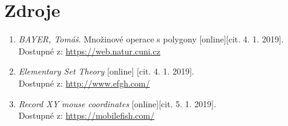\documentclass[a4paper, 12pt]{article}
\begin{document}
\section{Zdroje}
\begin{enumerate}
\item  \textsl{BAYER, Tomáš}. Množinové operace s polygony [online][cit. 4. 1. 2019].\\
Dostupné z: \href{https://web.natur.cuni.cz/~bayertom/images/courses/Adk/adk9.pdf}{https://web.natur.cuni.cz}

\item  \textsl{Elementary Set Theory} [online] [cit. 4. 1. 2019].\\
Dostupné z: \href{http://www.efgh.com/math/algebra/sets.htm}{http://www.efgh.com/}

\item \textsl{Record XY mouse coordinates} [online][cit. 5. 1. 2019].\\
Dostupné z: \href{https://mobilefish.com/services/record_mouse_coordinates/record_mouse_coordinates.php}{https://mobilefish.com/}\\
\end{enumerate}
\end{document}
